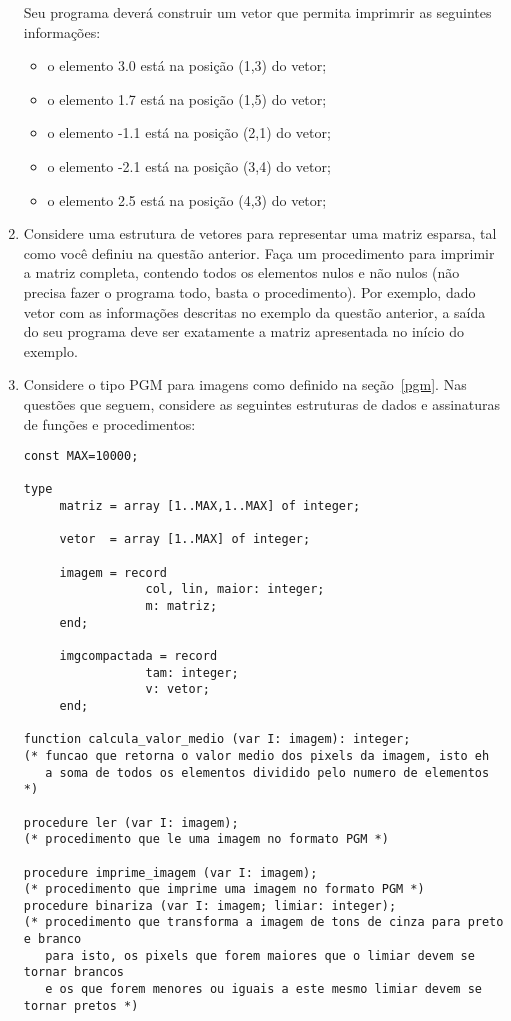 \begin{enumerate}
Seu programa deverá construir um 
vetor que permita imprimrir as seguintes informações:

\begin{itemize}
\item o elemento 3.0 está na posição (1,3) do vetor;
\item o elemento 1.7 está na posição (1,5) do vetor;
\item o elemento -1.1 está na posição (2,1) do vetor;
\item o elemento -2.1 está na posição (3,4) do vetor;
\item o elemento 2.5 está na posição (4,3) do vetor;
\end{itemize}

\item Considere uma estrutura de vetores para representar uma matriz 
esparsa, tal como você definiu na questão anterior. Faça
um procedimento para imprimir a matriz completa, contendo todos
os elementos nulos e não nulos 
(não precisa fazer o programa todo, basta o procedimento).
Por exemplo, dado vetor com as informações descritas no 
exemplo da questão anterior, a saída do seu programa deve
ser exatamente a matriz apresentada no início do exemplo.

\item Considere o tipo PGM para imagens como definido na seção~\ref{pgm}.
Nas questões que seguem, considere as seguintes estruturas de dados e 
assinaturas de funções e procedimentos:

\begin{lstlisting}
const MAX=10000;

type
     matriz = array [1..MAX,1..MAX] of integer;

     vetor  = array [1..MAX] of integer;

     imagem = record
                 col, lin, maior: integer;
                 m: matriz;
     end;

     imgcompactada = record
                 tam: integer;
                 v: vetor;
     end;
  
function calcula_valor_medio (var I: imagem): integer;
(* funcao que retorna o valor medio dos pixels da imagem, isto eh
   a soma de todos os elementos dividido pelo numero de elementos *)

procedure ler (var I: imagem);
(* procedimento que le uma imagem no formato PGM *)

procedure imprime_imagem (var I: imagem);
(* procedimento que imprime uma imagem no formato PGM *)
procedure binariza (var I: imagem; limiar: integer);
(* procedimento que transforma a imagem de tons de cinza para preto e branco
   para isto, os pixels que forem maiores que o limiar devem se tornar brancos
   e os que forem menores ou iguais a este mesmo limiar devem se tornar pretos *)


\end{lstlisting}
\end{enumerate}
